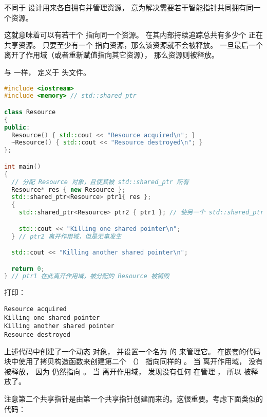 \documentclass[../../LearnCpp.tex]{subfiles}
\begin{document}

不同于  设计用来各自拥有并管理资源，
 意为解决需要若干智能指针共同拥有同一个资源。

这就意味着可以有若干个  指向同一个资源。
在其内部持续追踪总共有多少个  正在共享资源。
只要至少有一个  指向资源，那么该资源就不会被释放。
一旦最后一个  离开了作用域（或者重新赋值指向其它资源），
那么资源则被释放。

与  一样， 定义于  头文件。

\begin{lstlisting}[language=C++]
#include <iostream>
#include <memory> // std::shared_ptr

class Resource
{
public:
  Resource() { std::cout << "Resource acquired\n"; }
  ~Resource() { std::cout << "Resource destroyed\n"; }
};

int main()
{
  // 分配 Resource 对象，且使其被 std::shared_ptr 所有
  Resource* res { new Resource };
  std::shared_ptr<Resource> ptr1{ res };
  {
    std::shared_ptr<Resource> ptr2 { ptr1 }; // 使另一个 std::shared_ptr 指向同样的东西

    std::cout << "Killing one shared pointer\n";
  } // ptr2 离开作用域，但是无事发生

  std::cout << "Killing another shared pointer\n";

  return 0;
} // ptr1 在此离开作用域，被分配的 Resource 被销毁
\end{lstlisting}

打印：

\begin{lstlisting}
Resource acquired
Killing one shared pointer
Killing another shared pointer
Resource destroyed
\end{lstlisting}

上述代码中创建了一个动态  对象，
并设置一个名为  的  来管理它。
在嵌套的代码块中使用了拷贝构造函数来创建第二个 （）
指向同样的 。
当  离开作用域， 没有被释放，
因为  仍然指向 。
当  离开作用域， 发现没有任何  在管理 ，
所以  被释放了。

注意第二个共享指针是由第一个共享指针创建而来的。这很重要。考虑下面类似的代码：
\end{document}
